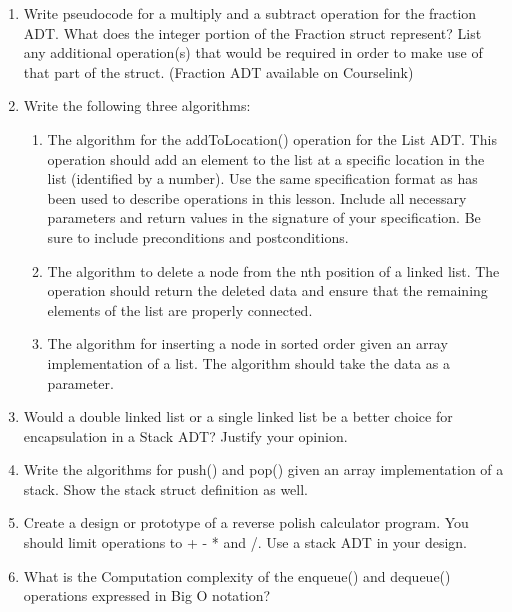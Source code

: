 \documentclass{article}
\begin{document}
\begin{enumerate}
\begin{enumerate}[label=\arabic*.]
			\item \rule{8cm}{0.1mm} \\
		\end{enumerate}
	\item Write pseudocode for a multiply and a subtract operation for the fraction ADT. What does the integer portion of the Fraction struct represent? List any additional operation(s) that would be required in order to make use of that part of the struct. (Fraction ADT available on Courselink)
	\newpage
	\item Write the following three algorithms:
		\begin{enumerate}[label=\arabic*.]
			\item The algorithm for the addToLocation() operation for the List ADT. This operation should add an element to the list at a specific location in the list (identified by a number). Use the same specification format as has been used to describe operations in this lesson. Include all necessary parameters and return values in the signature of your specification. Be sure to include preconditions and postconditions.
			\vspace{3cm}
			\item The algorithm to delete a node from the nth position of a linked list. The operation should return the deleted data and ensure that the remaining elements of the list are properly connected.
			\vspace{3cm}
			\item The algorithm for inserting a node in sorted order given an array implementation of a list. The algorithm should take the data as a parameter.
			\vspace{3cm}
		\end{enumerate}
	\item Would a double linked list or a single linked list be a better choice for encapsulation in a Stack ADT? Justify your opinion.
		\vspace{3cm}
	\item Write the algorithms for push() and pop() given an array implementation of a stack. Show the stack struct definition as well.
		\vspace{4cm}
	\newpage
	\item Create a design or prototype of a reverse polish calculator program. You should limit operations to + - * and /. Use a stack ADT in your design.
	\newpage
	\item What is the Computation complexity of the enqueue() and dequeue() operations expressed in Big O notation? \\\\

\end{enumerate}
\end{document}

